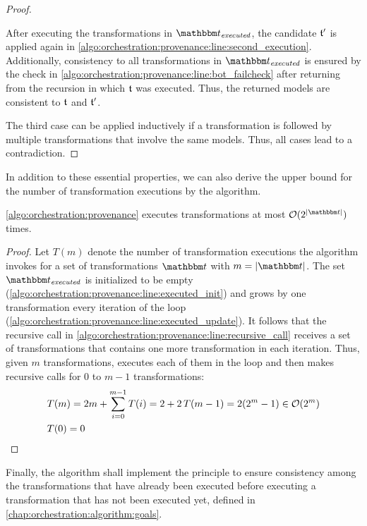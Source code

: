 \begin{proof}
\begin{longenumerate}
        After executing the transformations in $\provalgexecuted$, the candidate $\transformation{t}'$ is applied again in \autoref{algo:orchestration:provenance:line:second_execution}. 
        Additionally, consistency to all transformations in $\provalgexecuted$ is ensured by the check in \autoref{algo:orchestration:provenance:line:bot_failcheck} after returning from the recursion in which $\transformation{t}$ was executed.
        Thus, the returned models are consistent to $\transformation{t}$ and $\transformation{t}'$.
    \end{longenumerate}
    The third case can be applied inductively if a transformation is followed by multiple transformations that involve the same models. Thus, all cases lead to a contradiction.
\end{proof}

In addition to these essential properties, we can also derive the upper bound for the number of transformation executions by the algorithm.

\begin{theorem}
    \autoref{algo:orchestration:provenance} executes transformations at most $\mathcal{O}(2^{\abs{\transformationset{T}}})$ times.
\end{theorem}
\begin{proof}
	Let $T(m)$ denote the number of transformation executions the algorithm invokes for a set of transformations $\transformationset{T}$ with $m = \abs{\transformationset{T}}$.
	The set $\provalgexecuted$ is initialized to be empty (\autoref{algo:orchestration:provenance:line:executed_init}) and grows by one transformation every iteration of the loop (\autoref{algo:orchestration:provenance:line:executed_update}).
    It follows that the recursive call in \autoref{algo:orchestration:provenance:line:recursive_call} receives a set of transformations that contains one more transformation in each iteration.
    Thus, given $m$ transformations,  executes each of them in the loop and then makes recursive calls for $0$ to $m-1$ transformations:
    \begin{align*}
        &
    T(m)	=2m+\sum_{i=0}^{m-1}T(i)
    	=2+2\,T(m-1)
        =2(2^{m}-1) \in \mathcal{O}(2^m) \\
        &
    T(0)	=0 \qedhere
	\end{align*}
\end{proof}

Finally, the algorithm shall implement the principle to ensure consistency among the transformations that have already been executed before executing a transformation that has not been executed yet, defined in \autoref{chap:orchestration:algorithm:goals}.

